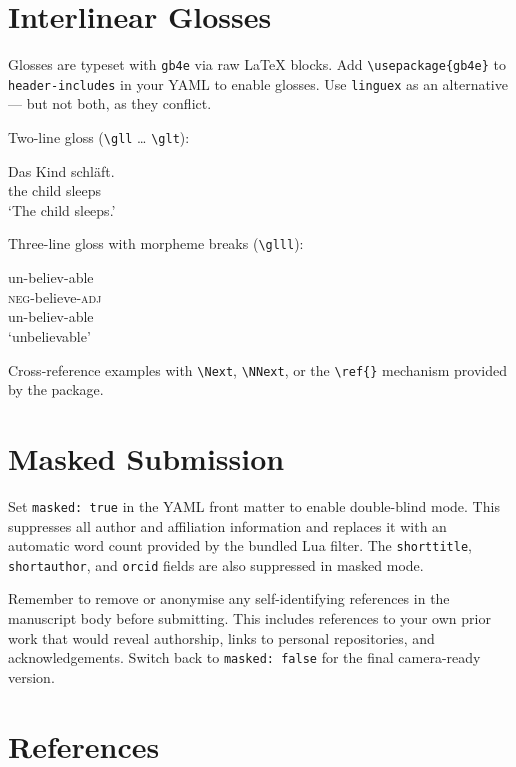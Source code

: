 \documentclass[
    a4paper,
    man,
    floatsintext
]{glossaPX2}
\begin{document}
\section{Interlinear Glosses}\label{interlinear-glosses}

Glosses are typeset with \texttt{gb4e} via raw LaTeX blocks. Add
\texttt{\textbackslash{}usepackage\{gb4e\}} to \texttt{header-includes}
in your YAML to enable glosses. Use \texttt{linguex} as an alternative
--- but not both, as they conflict.

Two-line gloss (\texttt{\textbackslash{}gll} \ldots{}
\texttt{\textbackslash{}glt}):

\begin{exe}
  \ex
  \gll Das Kind schläft. \\
       the child sleeps \\
  \glt `The child sleeps.'
\end{exe}

Three-line gloss with morpheme breaks (\texttt{\textbackslash{}glll}):

\begin{exe}
  \ex
  \glll un-believ-able \\
       \textsc{neg}-believe-\textsc{adj} \\
       un-believ-able \\
  \glt `unbelievable'
\end{exe}

Cross-reference examples with \texttt{\textbackslash{}Next},
\texttt{\textbackslash{}NNext}, or the \texttt{\textbackslash{}ref\{\}}
mechanism provided by the package.

\section{Masked Submission}\label{masked-submission}

Set \texttt{masked:\ true} in the YAML front matter to enable
double-blind mode. This suppresses all author and affiliation
information and replaces it with an automatic word count provided by the
bundled Lua filter. The \texttt{shorttitle}, \texttt{shortauthor}, and
\texttt{orcid} fields are also suppressed in masked mode.

Remember to remove or anonymise any self-identifying references in the
manuscript body before submitting. This includes references to your own
prior work that would reveal authorship, links to personal repositories,
and acknowledgements. Switch back to \texttt{masked:\ false} for the
final camera-ready version.

\section*{References}\label{references}

\printbibliography[heading=none]
\end{document}
